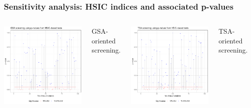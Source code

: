 \documentclass{beamer}
\begin{document}
\begin{frame}
\frametitle{Sensitivity analysis: HSIC indices and associated p-values}

  
  \begin{columns}
    
\includegraphics[width=.9\textwidth]{figures/plot_pval_GSA_MDTE.pdf}

\centering 
\small GSA-oriented screening.


\includegraphics[width=.9\textwidth]{figures/plot_pval_TSA_MDTE.pdf}

\centering 
\small TSA-oriented screening.

\end{columns}


\end{frame}
\end{document}
